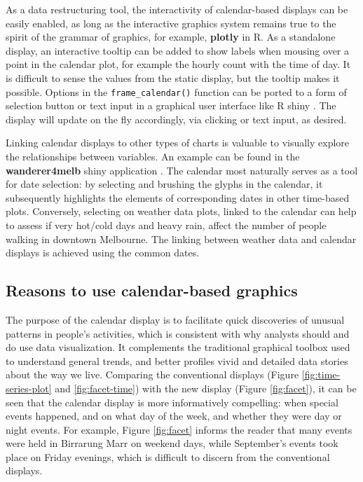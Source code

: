 \documentclass[12pt]{article}
\begin{document}
As a data restructuring tool, the interactivity of calendar-based displays can be easily enabled, as long as the interactive graphics system remains true to the spirit of the grammar of graphics, for example, \textbf{plotly} \citep{plotly} in R. As a standalone display, an interactive tooltip can be added to show labels when mousing over a point in the calendar plot, for example the hourly count with the time of day. It is difficult to sense the values from the static display, but the tooltip makes it possible. Options in the \texttt{frame\_calendar()} function can be ported to a form of selection button or text input in a graphical user interface like R shiny \citep{R-shiny}. The display will update on the fly accordingly, via clicking or text input, as desired.

Linking calendar displays to other types of charts is valuable to visually explore the relationships between variables. An example can be found in the \textbf{wanderer4melb} shiny application \citep{R-wanderer4melb}. The calendar most naturally serves as a tool for date selection: by selecting and brushing the glyphs in the calendar, it subsequently highlights the elements of corresponding dates in other time-based plots. Conversely, selecting on weather data plots, linked to the calendar can help to assess if very hot/cold days and heavy rain, affect the number of people walking in downtown Melbourne. The linking between weather data and calendar displays is achieved using the common dates.

\hypertarget{reasons-to-use-calendar-based-graphics}{%
\subsection{Reasons to use calendar-based graphics}\label{reasons-to-use-calendar-based-graphics}}

The purpose of the calendar display is to facilitate quick discoveries of unusual patterns in people's activities, which is consistent with why analysts should and do use data visualization. It complements the traditional graphical toolbox used to understand general trends, and better profiles vivid and detailed data stories about the way we live. Comparing the conventional displays (Figure \ref{fig:time-series-plot} and \ref{fig:facet-time}) with the new display (Figure \ref{fig:facet}), it can be seen that the calendar display is more informatively compelling: when special events happened, and on what day of the week, and whether they were day or night events. For example, Figure \ref{fig:facet} informs the reader that many events were held in Birrarung Marr on weekend days, while September's events took place on Friday evenings, which is difficult to discern from the conventional displays.
\end{document}
